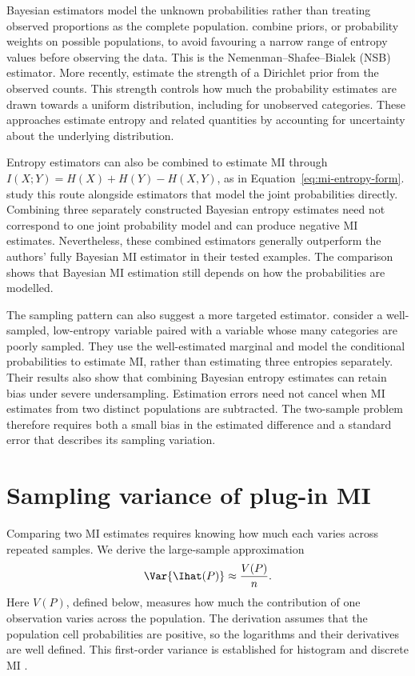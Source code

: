 Bayesian estimators model the unknown probabilities rather than treating
observed proportions as the complete population.
\citet{nemenman2002} combine priors, or probability weights on possible
populations, to avoid favouring a narrow range of entropy values before
observing the data. This is the Nemenman--Shafee--Bialek (NSB) estimator.
More recently, \citet{piga2024} estimate the strength of a Dirichlet prior
from the observed counts. This strength controls how much the probability
estimates are drawn towards a uniform distribution, including for
unobserved categories. These approaches estimate entropy and related
quantities by accounting for uncertainty about the underlying distribution.

Entropy estimators can also be combined to estimate MI through
\(I(X;Y)=H(X)+H(Y)-H(X,Y)\), as in
Equation~\eqref{eq:mi-entropy-form}. \citet{archer2013} study this route
alongside estimators that model the joint probabilities directly. Combining
three separately constructed Bayesian entropy estimates need not correspond
to one joint probability model and can produce negative MI estimates.
Nevertheless, these combined estimators generally outperform the authors'
fully Bayesian MI estimator in their tested examples. The comparison
shows that Bayesian MI estimation still depends on how the probabilities
are modelled.

The sampling pattern can also suggest a more targeted estimator.
\citet{hernandez2019} consider a well-sampled, low-entropy variable paired
with a variable whose many categories are poorly sampled. They use the
well-estimated marginal and model the conditional probabilities to estimate
MI, rather than estimating three entropies separately. Their results also
show that combining Bayesian entropy estimates can retain bias under severe
undersampling. Estimation errors need not cancel when MI estimates from
two distinct populations are subtracted. The two-sample problem therefore
requires both a small bias in the estimated difference and a standard error
that describes its sampling variation.

\section{Sampling variance of plug-in MI}
\label{sec:first-order-mi-background}

Comparing two MI estimates requires knowing how much each varies across
repeated samples. We derive the large-sample approximation
\begin{equation}
  \Var\{\Ihat(P)\}\approx\frac{V(P)}{n}.
  \label{eq:first-order-mi-var-background}
\end{equation}
Here \(V(P)\), defined below, measures how much the contribution of one
observation varies across the population. The derivation assumes that the
population cell probabilities are positive, so the logarithms and their
derivatives are well defined. This first-order variance is established for
histogram and discrete MI \citep{moddemeijer1989,brillinger2004}.

